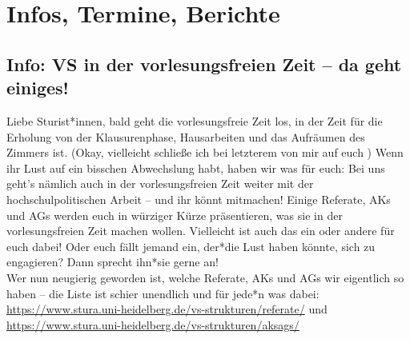 \section{Infos, Termine, Berichte}

\subsection{Info: VS in der vorlesungsfreien Zeit – da geht einiges!}
Liebe Sturist*innen, bald geht die vorlesungsfreie Zeit los, in der Zeit für die Erholung von der Klausurenphase, Hausarbeiten und das Aufräumen des Zimmers ist. (Okay, vielleicht schließe ich bei letzterem von mir auf euch ) Wenn ihr Lust auf ein bisschen Abwechslung habt, haben wir was für euch: Bei uns geht’s nämlich auch in der vorlesungsfreien Zeit weiter mit der hochschulpolitischen Arbeit – und ihr könnt mitmachen! Einige Referate, AKs und AGs werden euch in würziger Kürze präsentieren, was sie in der vorlesungsfreien Zeit machen wollen. Vielleicht ist auch das ein oder andere für euch dabei! Oder euch fällt jemand ein, der*die Lust haben könnte, sich zu engagieren? Dann sprecht ihn*sie gerne an!\\
Wer nun neugierig geworden ist, welche Referate, AKs und AGs wir eigentlich so haben – die Liste ist schier unendlich und für jede*n was dabei: \url{https://www.stura.uni-heidelberg.de/vs-strukturen/referate/} und \url{https://www.stura.uni-heidelberg.de/vs-strukturen/aksags/}

